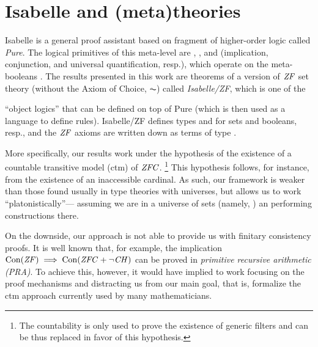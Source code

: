 \section{Isabelle and (meta)theories}
\label{sec:isabelle-metatheories}

Isabelle \cite{Isabelle,DBLP:books/sp/Paulson94} is a general proof
assistant based on fragment of higher-order logic called
\emph{Pure}. The logical primitives of this meta-level are
\isatt{\isasymLongrightarrow}, \isatt{\&\&\&}, and \isatt{\isasymAnd}
(implication, conjunction, and universal
quantification, resp.), which operate on the meta-booleans
. The results presented in this work are theorems of a
version of $\mathit{ZF}$ set theory (without the Axiom of Choice, $\AC$) 
called \emph{Isabelle/ZF}, which is one of the

``object logics'' that can be defined on top of Pure (which is then
used as a language to define rules). Isabelle/ZF defines types
 and  for sets and booleans, resp., and the $\mathit{ZF}$
axioms are written down as terms of type .

More specifically, our results work under the hypothesis of
the existence of a countable transitive model (ctm) of $\mathit{ZFC}$.%
\footnote{The countability is only used to prove the existence of
  generic filters and can be thus replaced in favor of this
  hypothesis.} 
This hypothesis follows, for instance, from the existence of an
inaccessible cardinal. As such, our framework is weaker than those
found usually in type theories with universes, but allows us to work
``platonistically''--- assuming we are in a universe of sets (namely,
) an performing constructions there. 

On the downside, our approach is not able to provide us with finitary
consistency proofs. It is well known that, for example, the
implication $\operatorname{Con}(\mathit{ZF}) \implies \operatorname{Con}(\mathit{ZFC}+\neg\mathit{CH})$ can be proved in
\emph{primitive recursive arithmetic (PRA)}. To achieve this, however,
it would have implied to work focusing on the proof mechanisms
and distracting us from our main goal, that is, formalize the ctm
approach currently used by many mathematicians.

